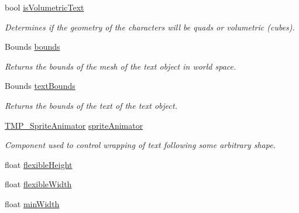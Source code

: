 \begin{DoxyCompactItemize}
bool \mbox{\hyperlink{class_t_m_pro_1_1_t_m_p___text_ad36339b6ac85f11142cab2bd8f336abd}{is\+Volumetric\+Text}}
\begin{DoxyCompactList}\small\item\em Determines if the geometry of the characters will be quads or volumetric (cubes). \end{DoxyCompactList}\item 
Bounds \mbox{\hyperlink{class_t_m_pro_1_1_t_m_p___text_af0cdaefdde3de248088f343cce0728c1}{bounds}}
\begin{DoxyCompactList}\small\item\em Returns the bounds of the mesh of the text object in world space. \end{DoxyCompactList}\item 
Bounds \mbox{\hyperlink{class_t_m_pro_1_1_t_m_p___text_aa61944e2c4973b8b7b07df8d8f15e2c9}{text\+Bounds}}
\begin{DoxyCompactList}\small\item\em Returns the bounds of the text of the text object. \end{DoxyCompactList}\item 
\mbox{\hyperlink{class_t_m_pro_1_1_t_m_p___sprite_animator}{T\+M\+P\+\_\+\+Sprite\+Animator}} \mbox{\hyperlink{class_t_m_pro_1_1_t_m_p___text_a013a80598d678447ae8104c50d3203cf}{sprite\+Animator}}
\begin{DoxyCompactList}\small\item\em Component used to control wrapping of text following some arbitrary shape. \end{DoxyCompactList}\item 
float \mbox{\hyperlink{class_t_m_pro_1_1_t_m_p___text_a19b8af303698cfa8117dcac2381bca90}{flexible\+Height}}
\item 
float \mbox{\hyperlink{class_t_m_pro_1_1_t_m_p___text_a8be9f32bae4a94101351d359c926ed82}{flexible\+Width}}
\item 
float \mbox{\hyperlink{class_t_m_pro_1_1_t_m_p___text_a33a9cad2c5d2664664fc4661729e831c}{min\+Width}}

\end{DoxyCompactItemize}
